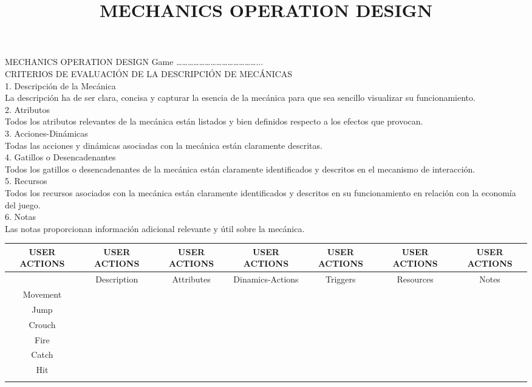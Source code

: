 \documentclass[12pt]{article}
\title{MECHANICS OPERATION DESIGN}
\date{}
\begin{document}
\maketitle

MECHANICS OPERATION DESIGN  Game ……………………………………... \\ 
CRITERIOS DE EVALUACIÓN DE LA DESCRIPCIÓN DE MECÁNICAS \\ 
1. Descripción de la Mecánica \\ 
La descripción ha de ser clara, concisa y capturar la esencia de la mecánica para que sea sencillo visualizar su funcionamiento. \\ 
2. Atributos \\ 
Todos los atributos relevantes de la mecánica están listados y bien definidos respecto a los efectos que provocan. \\ 
3. Acciones-Dinámicas \\ 
Todas las acciones y dinámicas asociadas con la mecánica están claramente descritas. \\ 
4. Gatillos o Desencadenantes \\ 
Todos los gatillos o desencadenantes de la mecánica están claramente identificados y descritos en el mecanismo de interacción. \\ 
5. Recursos \\ 
Todos los recursos asociados con la mecánica están claramente identificados y descritos en su funcionamiento en relación con la economía del juego. \\ 
6. Notas \\ 
Las notas proporcionan información adicional relevante y útil sobre la mecánica. \\ 
\begin{tabular}{|c|c|c|c|c|c|c|}
\hline
USER ACTIONS & USER ACTIONS & USER ACTIONS & USER ACTIONS & USER ACTIONS & USER ACTIONS & USER ACTIONS \\ \hline
 & Description & Attributes & Dinamics-Actions & Triggers & Resources & Notes \\ \hline
Movement &  &  &  &  &  &  \\ \hline
Jump &  &  &  &  &  &  \\ \hline
Crouch &  &  &  &  &  &  \\ \hline
Fire &  &  &  &  &  &  \\ \hline
Catch &  &  &  &  &  &  \\ \hline
Hit &  &  &  &  &  &  \\ \hline
 &  &  &  &  &  &  \\ \hline
\end{tabular}
\end{document}
